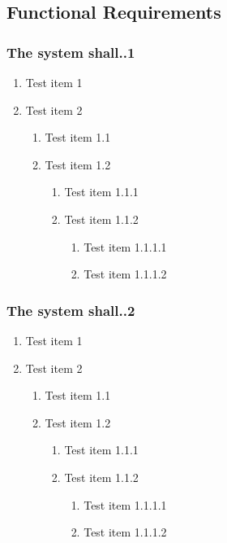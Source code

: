 \documentclass[12pt]{article}
\newenvironment{requirement}[1]
{
    \renewcommand{\thesubsubsection}{R\arabic{subsubsection}.}
    \renewcommand{\labelenumi}{
        \arabic{subsubsection}.\arabic{enumi}
    }
    \renewcommand{\labelenumii}{
        \arabic{subsubsection}.\arabic{enumi}.\arabic{enumii}
    }
    \renewcommand{\labelenumiii}{
        \arabic{subsubsection}.\arabic{enumi}.\arabic{enumii}.\arabic{enumiii}
    }
    \renewcommand{\labelenumiv}{
        \arabic{subsubsection}.\arabic{enumi}.\arabic{enumii}.\arabic{enumiii}.\arabic{enumiv}
    }
    \subsubsection{#1}
}
{}
\begin{document}
\subsection{Functional Requirements}
\begin{requirement}{The system shall..1}


\begin{enumerate}
    \item Test item 1
    \item Test item 2
    \begin{enumerate}
        \item Test item 1.1
        \item Test item 1.2
        \begin{enumerate}
            \item Test item 1.1.1
            \item Test item 1.1.2
            \begin{enumerate}
                \item Test item 1.1.1.1
                \item Test item 1.1.1.2
            \end{enumerate}
        \end{enumerate}
    \end{enumerate}
\end{enumerate}


\end{requirement}

\begin{requirement}{The system shall..2}


\begin{enumerate}
    \item Test item 1
    \item Test item 2
    \begin{enumerate}
        \item Test item 1.1
        \item Test item 1.2
        \begin{enumerate}
            \item Test item 1.1.1
            \item Test item 1.1.2
            \begin{enumerate}
                \item Test item 1.1.1.1
                \item Test item 1.1.1.2
            \end{enumerate}
        \end{enumerate}
    \end{enumerate}
\end{enumerate}


\end{requirement}
\end{document}

